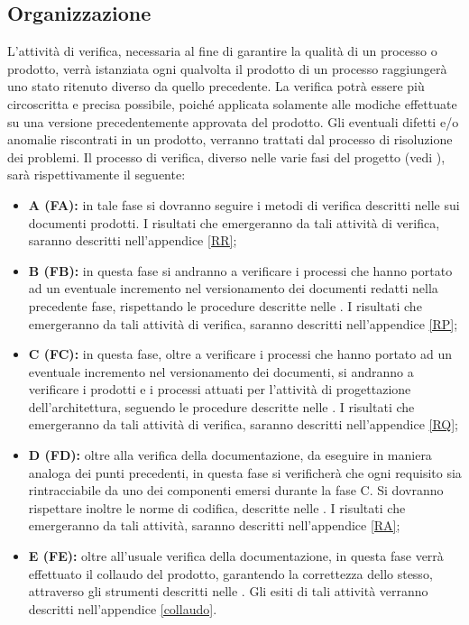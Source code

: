 \subsection{Organizzazione}
\label{organizzazione}
L'attività di verifica, necessaria al fine di garantire la qualità di un processo o prodotto, verrà istanziata ogni qualvolta il prodotto di un processo raggiungerà uno stato ritenuto diverso da quello precedente. La verifica potrà essere più circoscritta e precisa possibile, poiché applicata solamente alle modiche effettuate su una versione precedentemente approvata del prodotto.
Gli eventuali difetti e/o anomalie riscontrati in un prodotto, verranno trattati dal processo di risoluzione dei problemi.
Il processo di verifica, diverso nelle varie fasi del progetto (vedi \PdP ), sarà rispettivamente il seguente:\begin{center}
\begin{itemize}
	\item \textbf{A (FA):} in tale fase si dovranno seguire i metodi di verifica descritti nelle \NdP{} sui documenti prodotti. I risultati che emergeranno da tali attività di verifica, saranno descritti nell'appendice \ref{RR};
	
	\item \textbf{B (FB):} in questa fase si andranno a verificare i processi che hanno portato ad un eventuale incremento nel versionamento dei documenti redatti nella precedente fase, rispettando le procedure descritte nelle \NdP{}. I risultati che emergeranno da tali attività di verifica, saranno descritti nell'appendice \ref{RP};
	
	\item \textbf{C (FC):} in questa fase, oltre a verificare i processi che hanno portato ad un eventuale incremento nel versionamento dei documenti, si andranno a verificare i prodotti e i processi attuati per l'attività di progettazione dell'architettura, seguendo le procedure descritte nelle \NdP{}. I risultati che emergeranno da tali attività di verifica, saranno descritti nell'appendice \ref{RQ};
	
	\item \textbf{D (FD):} oltre alla verifica della documentazione, da eseguire in maniera analoga dei punti precedenti, in questa fase si verificherà che ogni requisito sia rintracciabile da uno dei componenti emersi durante la fase C. Si dovranno rispettare inoltre le norme di codifica, descritte nelle \NdP{}. I risultati che emergeranno da tali attività, saranno descritti nell'appendice \ref{RA};
	
	\item \textbf{E (FE):} oltre all'usuale verifica della documentazione, in questa fase verrà effettuato il collaudo del prodotto, garantendo la correttezza dello stesso, attraverso gli strumenti descritti nelle \NdP{}.
Gli esiti di tali attività verranno descritti nell'appendice \ref{collaudo}.
\end{itemize}
\end{center}

